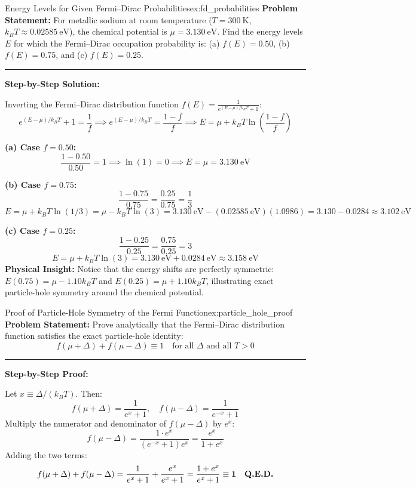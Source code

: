 \documentclass[11pt,a4paper]{article}
\begin{document}
\begin{examplebox}{Energy Levels for Given Fermi--Dirac Probabilities}{ex:fd_probabilities}
\textbf{Problem Statement:}
For metallic sodium at room temperature ($T = 300\ \mathrm{K}$, $k_B T \approx 0.02585\ \mathrm{eV}$), the chemical potential is $\mu = 3.130\ \mathrm{eV}$. Find the energy levels $E$ for which the Fermi--Dirac occupation probability is:
(a) $f(E) = 0.50$, (b) $f(E) = 0.75$, and (c) $f(E) = 0.25$.

\vspace{0.2cm}\hrule\vspace{0.2cm}
\textbf{Step-by-Step Solution:}

Inverting the Fermi--Dirac distribution function $f(E) = \frac{1}{e^{(E-\mu)/k_BT} + 1}$:
\[
e^{(E-\mu)/k_BT} + 1 = \frac{1}{f} \implies e^{(E-\mu)/k_BT} = \frac{1-f}{f} \implies E = \mu + k_B T \ln\left(\frac{1-f}{f}\right)
\]

\textbf{(a) Case $f = 0.50$:}
\[
\frac{1-0.50}{0.50} = 1 \implies \ln(1) = 0 \implies E = \mu = \mathbf{3.130\ \mathrm{eV}}
\]

\textbf{(b) Case $f = 0.75$:}
\[
\frac{1-0.75}{0.75} = \frac{0.25}{0.75} = \frac{1}{3}
\]
\[
E = \mu + k_B T \ln(1/3) = \mu - k_B T \ln(3) = 3.130\ \mathrm{eV} - (0.02585\ \mathrm{eV})(1.0986) = 3.130 - 0.0284 \approx \mathbf{3.102\ \mathrm{eV}}
\]

\textbf{(c) Case $f = 0.25$:}
\[
\frac{1-0.25}{0.25} = \frac{0.75}{0.25} = 3
\]
\[
E = \mu + k_B T \ln(3) = 3.130\ \mathrm{eV} + 0.0284\ \mathrm{eV} \approx \mathbf{3.158\ \mathrm{eV}}
\]
\textbf{Physical Insight:} Notice that the energy shifts are perfectly symmetric: $E(0.75) = \mu - 1.10 k_B T$ and $E(0.25) = \mu + 1.10 k_B T$, illustrating exact particle-hole symmetry around the chemical potential.
\end{examplebox}

\vspace{0.4cm}

\begin{examplebox}{Proof of Particle-Hole Symmetry of the Fermi Function}{ex:particle_hole_proof}
\textbf{Problem Statement:}
Prove analytically that the Fermi--Dirac distribution function satisfies the exact particle-hole identity:
\[
f(\mu + \Delta) + f(\mu - \Delta) \equiv 1 \quad \text{for all } \Delta \text{ and all } T > 0
\]

\vspace{0.2cm}\hrule\vspace{0.2cm}
\textbf{Step-by-Step Proof:}

Let $x \equiv \Delta / (k_B T)$. Then:
\[
f(\mu + \Delta) = \frac{1}{e^x + 1}, \quad f(\mu - \Delta) = \frac{1}{e^{-x} + 1}
\]
Multiply the numerator and denominator of $f(\mu - \Delta)$ by $e^x$:
\[
f(\mu - \Delta) = \frac{1 \cdot e^x}{(e^{-x} + 1)e^x} = \frac{e^x}{1 + e^x}
\]
Adding the two terms:
\[
f(\mu + \Delta) + f(\mu - \Delta) = \frac{1}{e^x + 1} + \frac{e^x}{e^x + 1} = \frac{1 + e^x}{e^x + 1} \equiv \mathbf{1} \quad \text{\textbf{Q.E.D.}}
\]
\end{examplebox}
\end{document}
